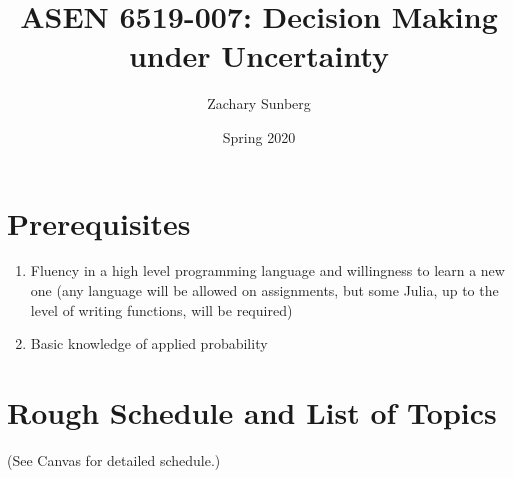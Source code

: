 \documentclass[10pt]{article}
\title{ASEN 6519-007: Decision Making under Uncertainty}
\author{Zachary Sunberg}
\date{Spring 2020}
\begin{document}
\maketitle

\section*{Prerequisites}

\begin{enumerate}[noitemsep]
    \item Fluency in a high level programming language and willingness to learn a new one (any language will be allowed on assignments, but some Julia, up to the level of writing functions, will be required)
    \item Basic knowledge of applied probability
\end{enumerate}

\section*{Rough Schedule and List of Topics}

(See Canvas for detailed schedule.)
\end{document}
